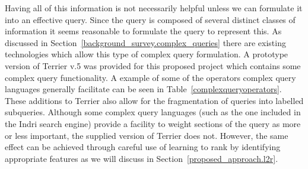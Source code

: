 \documentclass{mprop}
\begin{document}
Having all of this information is not necessarily helpful unless we can formulate it into an effective query.
Since the query is composed of several distinct classes of information it seems reasonable to formulate the query to represent this.
As discussed in Section~\ref{background_survey.complex_queries} there are existing technologies which allow this type of complex query formulation. 
A prototype version of Terrier v.5 was provided for this proposed project which contains some complex query functionality. 
A example of some of the operators complex query languages generally facilitate can be seen in Table~\ref{complexqueryoperators}.
These additions to Terrier also allow for the fragmentation of queries into labelled subqueries.
Although some complex query languages (such as the one included in the Indri search engine) provide a facility to weight sections of the query as more or less important, the supplied version of Terrier does not.
However, the same effect can be achieved through careful use of learning to rank by identifying appropriate features as we will discuss in Section~\ref{proposed_approach.l2r}.
\end{document}
